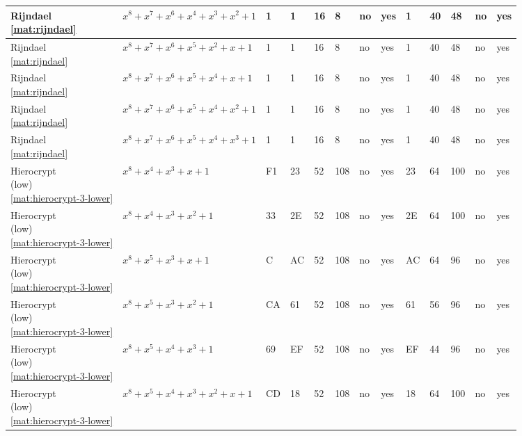\begin{tiny}
\begin{longtable}{|l|l|l|l|l|l|l|l|l|l|l|l|l|}
\shortstack{Rijndael \\ \eqref{mat:rijndael}} & $x^8 + x^7 + x^6 + x^4 + x^3 + x^2 + 1$ & 1 & 1 & 16 & 8 & no & yes & 1 & 40 & 48 & no & yes \\ \hline
\shortstack{Rijndael \\ \eqref{mat:rijndael}} & $x^8 + x^7 + x^6 + x^5 + x^2 + x + 1$ & 1 & 1 & 16 & 8 & no & yes & 1 & 40 & 48 & no & yes \\ \hline
\shortstack{Rijndael \\ \eqref{mat:rijndael}} & $x^8 + x^7 + x^6 + x^5 + x^4 + x + 1$ & 1 & 1 & 16 & 8 & no & yes & 1 & 40 & 48 & no & yes \\ \hline
\shortstack{Rijndael \\ \eqref{mat:rijndael}} & $x^8 + x^7 + x^6 + x^5 + x^4 + x^2 + 1$ & 1 & 1 & 16 & 8 & no & yes & 1 & 40 & 48 & no & yes \\ \hline
\shortstack{Rijndael \\ \eqref{mat:rijndael}} & $x^8 + x^7 + x^6 + x^5 + x^4 + x^3 + 1$ & 1 & 1 & 16 & 8 & no & yes & 1 & 40 & 48 & no & yes \\ \hline
\shortstack{Hierocrypt \\ (low) \\ \eqref{mat:hierocrypt-3-lower}} & $x^8 + x^4 + x^3 + x + 1$ & F1 & 23 & 52 & 108 & no & yes & 23 & 64 & 100 & no & yes \\ \hline
\shortstack{Hierocrypt \\ (low) \\ \eqref{mat:hierocrypt-3-lower}} & $x^8 + x^4 + x^3 + x^2 + 1$ & 33 & 2E & 52 & 108 & no & yes & 2E & 64 & 100 & no & yes \\ \hline
\shortstack{Hierocrypt \\ (low) \\ \eqref{mat:hierocrypt-3-lower}} & $x^8 + x^5 + x^3 + x + 1$ & C & AC & 52 & 108 & no & yes & AC & 64 & 96 & no & yes \\ \hline
\shortstack{Hierocrypt \\ (low) \\ \eqref{mat:hierocrypt-3-lower}} & $x^8 + x^5 + x^3 + x^2 + 1$ & CA & 61 & 52 & 108 & no & yes & 61 & 56 & 96 & no & yes \\ \hline
\shortstack{Hierocrypt \\ (low) \\ \eqref{mat:hierocrypt-3-lower}} & $x^8 + x^5 + x^4 + x^3 + 1$ & 69 & EF & 52 & 108 & no & yes & EF & 44 & 96 & no & yes \\ \hline
\shortstack{Hierocrypt \\ (low) \\ \eqref{mat:hierocrypt-3-lower}} & $x^8 + x^5 + x^4 + x^3 + x^2 + x + 1$ & CD & 18 & 52 & 108 & no & yes & 18 & 64 & 100 & no & yes \\ \hline

\end{longtable}
\end{tiny}
